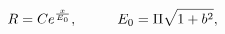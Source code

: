 \begin{equation}
\label{ST5} 
R = C e^{\frac{x}{E_0}},
\hspace{1.0cm}
E_0 = \Pi \sqrt{1 + b^2},
\end{equation}

